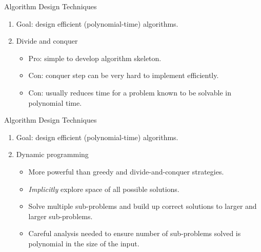    \begin{frame}[fragile]{Algorithm Design Techniques}

  \begin{enumerate}
  \item Goal: design efficient (polynomial-time) algorithms.
  \item Divide and conquer
    \begin{itemize}
    \item Pro: simple to develop algorithm skeleton.
    \item Con: conquer step can be very hard to implement efficiently.
    \item Con: usually reduces time for a problem known to be solvable
      in polynomial time.    
    \end{itemize}
  \end{enumerate}
\end{frame}

   \begin{frame}[fragile]{Algorithm Design Techniques}

  \begin{enumerate}
  \item Goal: design efficient (polynomial-time) algorithms.
  \item Dynamic programming
    \begin{itemize}
    \item More powerful than greedy and divide-and-conquer strategies.
    \item \emph{Implicitly} explore space of all possible solutions.
    \item Solve multiple sub-problems and build up correct solutions to
      larger and larger sub-problems.
    \item Careful analysis needed to ensure number of sub-problems
      solved is polynomial in the size of the input.
    \end{itemize}
  \end{enumerate}
\end{frame}


